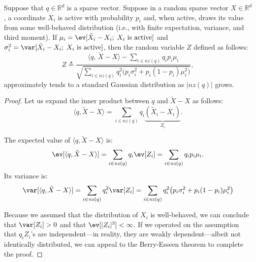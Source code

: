 \begin{theorem}
    Suppose that $q \in \mathbb{R}^d$ is a sparse vector.
    Suppose in a random sparse vector $X \in \mathbb{R}^d$,
    a coordinate $X_i$ is active with probability $p_i$ and, when active,
    draws its value from some well-behaved distribution (i.e., with finite expectation,
    variance, and third moment).
    If $\mu_i = \ev[\tilde{X}_i - X_i;\; X_i \text{ is active}]$ and
    $\sigma_i^2 = \var[\tilde{X}_i - X_i;\; X_i \text{ is active}]$,
    then the random variable $Z$ defined as follows:
    \begin{equation}
        Z \triangleq \frac{\langle q,\, \tilde{X} - X \rangle - \sum_{i \in \mathit{nz}(q)} q_i p_i \mu_i}{\sqrt{\sum_{i \in \mathit{nz}(q)} q_i^2 \big( p_i \sigma_i^2 + p_i (1 - p_i) \mu_i^2 \big)}},
    \end{equation}
    approximately tends to a standard Gaussian distribution as $\lvert \mathit{nz}(q) \rvert$ grows.
\end{theorem}
\begin{proof}
    Let us expand the inner product between $q$ and $\tilde{X} - X$ as follows:
    \begin{equation}
        \langle q, \tilde{X} - X \rangle = \sum_{i \in \mathit{nz}(q)} q_i \underbrace{(\tilde{X}_i - X_i)}_{Z_i}.
    \end{equation}

    The expected value of $\langle q, \tilde{X} - X \rangle$ is:
    \begin{equation*}
        \ev[\langle q, \tilde{X} - X \rangle] = \sum_{i \in \mathit{nz}(q)} q_i \ev[Z_i] =
        \sum_{i \in \mathit{nz}(q)} q_i p_i \mu_i.
    \end{equation*}
    Its variance is:
    \begin{equation*}
        \var[\langle q, \tilde{X} - X \rangle] = \sum_{i \in \mathit{nz}(q)} q_i^2 \var[Z_i] =
        \sum_{i \in \mathit{nz}(q)} q_i^2 \big( p_i \sigma_i^2 + p_i (1 - p_i) \mu_i^2 \big)
    \end{equation*}

    Because we assumed that the distribution of $X_i$ is well-behaved,
    we can conclude that $\var[Z_i] > 0$ and that $\ev[|Z_i|^3] < \infty$.
    If we operated on the assumption that $q_i Z_i$'s are independent---in reality,
    they are weakly dependent---albeit not identically distributed,
    we can appeal to the Berry-Esseen theorem to complete the proof.
\end{proof}

